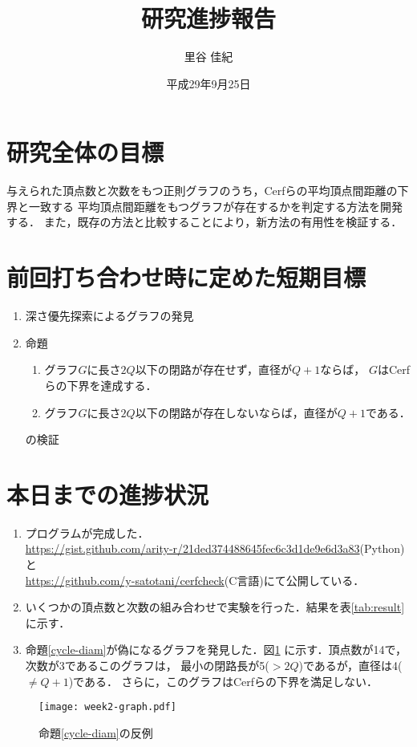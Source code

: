\documentclass[11pt]{jarticle}
\title{研究進捗報告}
\author{里谷 佳紀}
\date{平成29年9月25日}
\begin{document}
%
\maketitle
\thispagestyle{empty}
%
\section{研究全体の目標}
与えられた頂点数と次数をもつ正則グラフのうち，Cerfらの平均頂点間距離の下界\cite{Cerf1974}と一致する
平均頂点間距離をもつグラフが存在するかを判定する方法を開発する．
また，既存の方法\cite{Yamamoto2016}と比較することにより，新方法の有用性を検証する．

\section{前回打ち合わせ時に定めた短期目標}
\begin{enumerate}
\item 深さ優先探索によるグラフの発見
\item 命題
  \begin{enumerate}
  \item グラフ$G$に長さ$2Q$以下の閉路が存在せず，直径が$Q+1$ならば，
    $G$はCerfらの下界を達成する．
  \item \label{cycle-diam}
    グラフ$G$に長さ$2Q$以下の閉路が存在しないならば，直径が$Q+1$である．
  \end{enumerate}
  の検証
\end{enumerate}

\section{本日までの進捗状況}
\begin{enumerate}
\item プログラムが完成した．\\
  \url{https://gist.github.com/arity-r/21ded374488645fec6c3d1de9e6d3a83}(Python)と\\
  \url{https://github.com/y-satotani/cerfcheck}(C言語)にて公開している．
\item いくつかの頂点数と次数の組み合わせで実験を行った．結果を表\ref{tab:result}
  に示す．
\item 命題\ref{cycle-diam}が偽になるグラフを発見した．図\ref{fig:cycle-diam}
  に示す．頂点数が14で，次数が3であるこのグラフは，
  最小の閉路長が5($>2Q$)であるが，直径は4($\neq Q+1$)である．
  さらに，このグラフはCerfらの下界を満足しない．
\end{enumerate}



\begin{figure}[H]
  \centering
  \texttt{[image: week2-graph.pdf]}
  \caption{命題\ref{cycle-diam}の反例}
  \label{fig:cycle-diam}
\end{figure}



\end{document}
